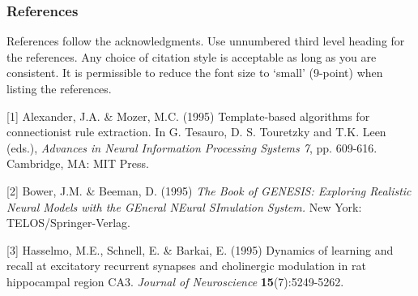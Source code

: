 \documentclass{article}
\begin{document}
\subsubsection*{References}

References follow the acknowledgments. Use unnumbered third level heading for
the references. Any choice of citation style is acceptable as long as you are
consistent. It is permissible to reduce the font size to `small' (9-point) 
when listing the references.

\small{
[1] Alexander, J.A. \& Mozer, M.C. (1995) Template-based algorithms
for connectionist rule extraction. In G. Tesauro, D. S. Touretzky
and T.K. Leen (eds.), {\it Advances in Neural Information Processing
Systems 7}, pp. 609-616. Cambridge, MA: MIT Press.

[2] Bower, J.M. \& Beeman, D. (1995) {\it The Book of GENESIS: Exploring
Realistic Neural Models with the GEneral NEural SImulation System.}
New York: TELOS/Springer-Verlag.

[3] Hasselmo, M.E., Schnell, E. \& Barkai, E. (1995) Dynamics of learning
and recall at excitatory recurrent synapses and cholinergic modulation
in rat hippocampal region CA3. {\it Journal of Neuroscience}
{\bf 15}(7):5249-5262.
}
\end{document}

